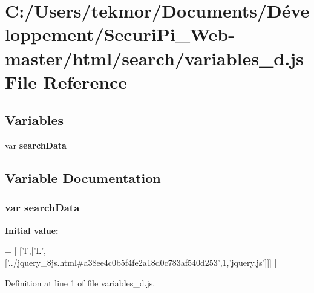\section{C\+:/\+Users/tekmor/\+Documents/\+Développement/\+Securi\+Pi\+\_\+\+Web-\/master/html/search/variables\+\_\+d.js File Reference}
\label{variables__d_8js}
\subsection*{Variables}
\begin{DoxyCompactItemize}
\item 
var {\bf search\+Data}
\end{DoxyCompactItemize}


\subsection{Variable Documentation}
\subsubsection[{search\+Data}]{\setlength{\rightskip}{0pt plus 5cm}var search\+Data}\label{variables__d_8js_ad01a7523f103d6242ef9b0451861231e}
{\bfseries Initial value\+:}
\begin{DoxyCode}
=
[
  [\textcolor{charliteral}{'l'},[\textcolor{charliteral}{'L'},[\textcolor{stringliteral}{'../jquery\_8js.html#a38ee4c0b5f4fe2a18d0c783af540d253'},1,\textcolor{stringliteral}{'jquery.js'}]]]
]
\end{DoxyCode}


Definition at line 1 of file variables\+\_\+d.\+js.

